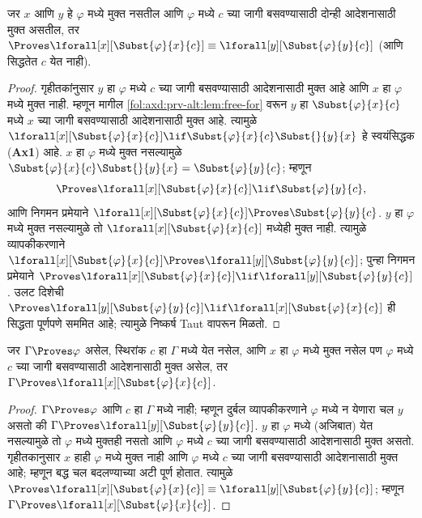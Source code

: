 \begin{lem}[बद्ध चराचा बदल]
\label{fol:axd:prv-alt:lem:ChangeBdVar}
जर $x$ आणि $y$ हे $\varphi$ मध्ये मुक्त नसतील आणि $\varphi$ मध्ये $c$ च्या जागी
बसवण्यासाठी दोन्ही आदेशनासाठी मुक्त असतील, तर
$\Proves \lforall[x][\Subst{\varphi}{x}{c}] \equiv
\lforall[y][\Subst{\varphi}{y}{c}]$ (आणि सिद्धतेत $c$ येत नाही).
\end{lem}

\begin{proof}
गृहीतकांनुसार $y$ हा $\varphi$ मध्ये $c$ च्या जागी बसवण्यासाठी आदेशनासाठी मुक्त
आहे आणि $x$ हा $\varphi$ मध्ये मुक्त नाही. म्हणून मागील
\ref{fol:axd:prv-alt:lem:free-for} वरून $y$ हा $\Subst{\varphi}{x}{c}$ मध्ये $x$ च्या
जागी बसवण्यासाठी आदेशनासाठी मुक्त आहे. त्यामुळे
$\lforall[x][\Subst{\varphi}{x}{c}] \lif \Subst{\varphi}{x}{c} \Subst{}{y}{x}$
हे स्वयंसिद्धक (\textbf{Ax1}) आहे. $x$ हा $\varphi$ मध्ये मुक्त नसल्यामुळे
$\Subst{\varphi}{x}{c} \Subst{}{y}{x} = \Subst{\varphi}{y}{c}$; म्हणून
\[
\Proves \lforall[x][\Subst{\varphi}{x}{c}] \lif \Subst{\varphi}{y}{c},
\]
आणि निगमन प्रमेयाने $\lforall[x][\Subst{\varphi}{x}{c}] \Proves
\Subst{\varphi}{y}{c}$. $y$ हा $\varphi$ मध्ये मुक्त नसल्यामुळे तो
$\lforall[x][\Subst{\varphi}{x}{c}]$ मध्येही मुक्त नाही. त्यामुळे
व्यापकीकरणाने $\lforall[x][\Subst{\varphi}{x}{c}] \Proves
\lforall[y][\Subst{\varphi}{y}{c}]$; पुन्हा निगमन प्रमेयाने
$\Proves \lforall[x][\Subst{\varphi}{x}{c}] \lif
\lforall[y][\Subst{\varphi}{y}{c}]$. उलट दिशेची
$\Proves \lforall[y][\Subst{\varphi}{y}{c}] \lif \lforall[x]
[\Subst{\varphi}{x}{c}]$ ही सिद्धता पूर्णपणे सममित आहे; त्यामुळे
निष्कर्ष Taut वापरून मिळतो.
\end{proof}

\begin{thm}
\label{fol:axd:prv-alt:thm:StrongGen}
जर $\Gamma \Proves \varphi$ असेल, स्थिरांक $c$ हा $\Gamma$ मध्ये येत
नसेल, आणि $x$ हा $\varphi$ मध्ये मुक्त नसेल पण $\varphi$ मध्ये $c$ च्या जागी
बसवण्यासाठी आदेशनासाठी मुक्त असेल, तर
$\Gamma \Proves \lforall[x][\Subst{\varphi}{x}{c}]$.
\end{thm}

\begin{proof}
$\Gamma \Proves \varphi$ आणि $c$ हा $\Gamma$ मध्ये नाही; म्हणून दुर्बल
व्यापकीकरणाने $\varphi$ मध्ये न येणारा चल $y$ असतो की
$\Gamma \Proves \lforall[y][\Subst{\varphi}{y}{c}]$. $y$ हा $\varphi$ मध्ये
(अजिबात) येत नसल्यामुळे तो $\varphi$ मध्ये मुक्तही नसतो आणि $\varphi$ मध्ये
$c$ च्या जागी बसवण्यासाठी आदेशनासाठी मुक्त असतो. गृहीतकानुसार $x$ हाही
$\varphi$ मध्ये मुक्त नाही आणि $\varphi$ मध्ये $c$ च्या जागी बसवण्यासाठी आदेशनासाठी मुक्त
आहे; म्हणून बद्ध चल बदलण्याच्या अटी पूर्ण होतात. त्यामुळे
$\Proves \lforall[x][\Subst{\varphi}{x}{c}] \equiv
\lforall[y][\Subst{\varphi}{y}{c}]$; म्हणून
$\Gamma \Proves \lforall[x][\Subst{\varphi}{x}{c}]$.
\end{proof}

